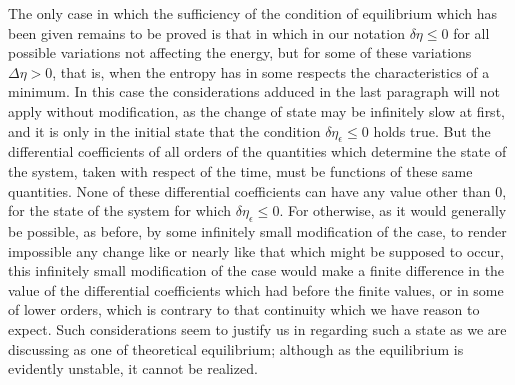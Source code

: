 \documentclass[12pt]{article}
\begin{document}
The only case in which the sufficiency of the condition of equilibrium which has been given remains to be proved is that in which in our notation $\delta \eta \leq 0$ for all possible variations not affecting the energy, but for some of these variations $\Delta \eta >0$, that is, when the entropy has in some respects the characteristics of a minimum. In this case the considerations adduced in the last paragraph will not apply without modification, as the change of state may be infinitely slow at first, and it is only in the initial state that the condition $\delta \eta_\epsilon \leq 0$ holds true. But the differential coefficients of all orders of the quantities which determine the state of the system, taken with respect of the time, must be functions of these same quantities. None of these differential coefficients can have any value other than 0, for the state of the system for which $\delta \eta_\epsilon \leq 0$. For otherwise, as it would generally be possible, as before, by some infinitely small modification of the case, to render impossible any change like or nearly like that which might be supposed to occur, this infinitely small modification of the case would make a finite difference in the value of the differential coefficients which had before the finite values, or in some of lower orders, which is contrary to that continuity which we have reason to expect. Such considerations seem to justify us in regarding such a state as we are discussing as one of theoretical equilibrium; although as the equilibrium is evidently unstable, it cannot be realized. 
\end{document}
